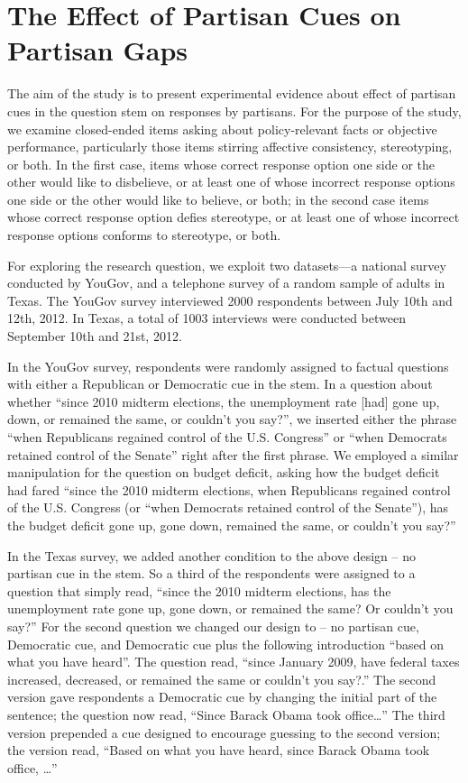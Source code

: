 \documentclass[12pt, letterpaper]{article}
\begin{document}


\newpage

\section*{The Effect of Partisan Cues on Partisan Gaps}\label{subsec:partisan-cues}
The aim of the study is to present experimental evidence about effect of partisan cues in the question stem on responses by partisans. For the purpose of the study, we examine closed-ended items asking about policy-relevant facts or objective performance, particularly those items stirring affective consistency, stereotyping, or both.  In the first case, items whose correct response option one side or the other would like to disbelieve, or at least one of whose incorrect response options one side or the other would like to believe, or both; in the second case items whose correct response option defies stereotype, or at least one of whose incorrect response options conforms to stereotype, or both.  

For exploring the research question, we exploit two datasets---a national survey conducted by YouGov, and a telephone survey of a random sample of adults in Texas. The YouGov survey interviewed 2000 respondents between July 10th and 12th, 2012.  In Texas, a total of 1003 interviews were conducted between September 10th and 21st, 2012. 

In the YouGov survey, respondents were randomly assigned to factual questions with either a Republican or Democratic cue in the stem. In a question about whether ``since 2010 midterm elections, the unemployment rate [had] gone up, down, or remained the same, or couldn't you say?'', we inserted either the phrase “when Republicans regained control of the U.S. Congress'' or ``when Democrats retained control of the Senate” right after the first phrase. We employed a similar manipulation for the question on budget deficit, asking how the budget deficit had fared “since the 2010 midterm elections, when Republicans regained control of the U.S. Congress (or ``when Democrats retained control of the Senate''), has the budget deficit gone up, gone down, remained the same, or couldn't you say?''

In the Texas survey, we added another condition to the above design – no partisan cue in the stem. So a third of the respondents were assigned to a question that simply read, ``since the 2010 midterm elections, has the unemployment rate gone up, gone down, or remained the same?  Or couldn’t you say?'' For the second question we changed our design to – no partisan cue, Democratic cue, and Democratic cue plus the following introduction “based on what you have heard”. The question read, ``since January 2009, have federal taxes increased, decreased, or remained the same or couldn’t you say?.'' The second version gave respondents a Democratic cue by changing the initial part of the sentence; the question now read, “Since Barack Obama took office\ldots''  The third version prepended a cue designed to encourage guessing to the second version; the version read, “Based on what you have heard, since Barack Obama took office, \ldots''
\end{document}
